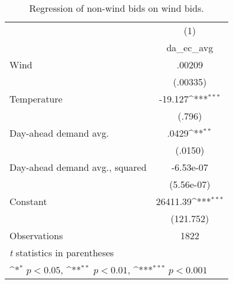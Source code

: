 \begin{table}[htbp]\centering
\def\sym#1{\ifmmode^{#1}\else\(^{#1}\)\fi}
\caption{Regression of non-wind bids on wind bids.\label{tab1}}
\begin{tabular}{l*{1}{c}}
\hline\hline
                    &\multicolumn{1}{c}{(1)}\\
                    &\multicolumn{1}{c}{da\_ec\_avg}\\
\hline
Wind                &      .00209         \\
                    &     (.00335)         \\
[1em]
Temperature         &       -19.127\sym{***}\\
                    &     (.796)         \\
[1em]                    
Day-ahead demand avg.             &       .0429\sym{**}\\
                    &     (.0150)         \\
[1em]
Day-ahead demand avg., squared            &      -6.53e-07         \\
                    &     (5.56e-07)         \\
[1em]
Constant            &       26411.39\sym{***} \\
                    &      (121.752)         \\
\hline
Observations        &        1822         \\
\hline\hline
\multicolumn{2}{l}{\footnotesize \textit{t} statistics in parentheses}\\
\multicolumn{2}{l}{\footnotesize \sym{*} \(p<0.05\), \sym{**} \(p<0.01\), \sym{***} \(p<0.001\)}\\
\end{tabular}
\end{table}
